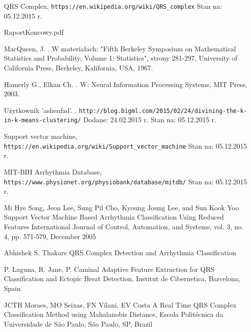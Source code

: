 
\begin{thebibliography}{99} %

 
QRS Complex,
\newblock \texttt{https://en.wikipedia.org/wiki/QRS\_complex}
\newblock Stan na: 05.12.2015 r.

RaportKoncowy.pdf

MacQueen, J.
.
\newblock W materiałach: "Fifth Berkeley Symposium on Mathematical Statistics and Probability, Volume 1: Statistics", strony 281-297,
\newblock University of California Press, Berkeley, Kalifornia, USA, 1967. 

Hamerly G., Elkan Ch.
.
\newblock W: Neural Information Processing Systems,
\newblock MIT Press, 2003.

Użytkownik 'ashenfad'.
.
\newblock \texttt{http://blog.bigml.com/2015/02/24/divining-the-k-in-k-means-clustering/}
\newblock Dodane: 24.02.2015 r.
\newblock Stan na: 05.12.2015 r.

Support vector machine,
\newblock \texttt{https://en.wikipedia.org/wiki/Support\_vector\_machine}
\newblock Stan na: 05.12.2015 r.

MIT-BIH Arrhythmia Database,
\newblock \texttt{https://www.physionet.org/physiobank/database/mitdb/}
\newblock Stan na: 05.12.2015 r.

Mi Hye Song, Jeon Lee, Sung Pil Cho, Kyoung Joung Lee, and Sun Kook Yoo
\newblock Support Vector Machine Based Arrhythmia Classification
Using Reduced Features
\newblock 
International Journal of Control, Automation, and Systems, vol. 3, no. 4, pp. 571-579, December 2005 

Abhishek S. Thakare
\newblock QRS Complex Detection and Arrhythmia Classification

P. Laguna, R. Jane, P. Caminal
\newblock Adaptive Feature Extraction for QRS Classification and Ectopic Breat Detection,
\newblock Institut de Cibernetica, Barcelona, Spain


JCTB Moraes, MO Seixas, FN Vilani, EV Costa
\newblock A Real Time QRS Complex Classification Method using Mahalanobis Distance,
\newblock Escola Politécnica da Universidade de São Paulo, São Paulo, SP, Brazil


\end{thebibliography}